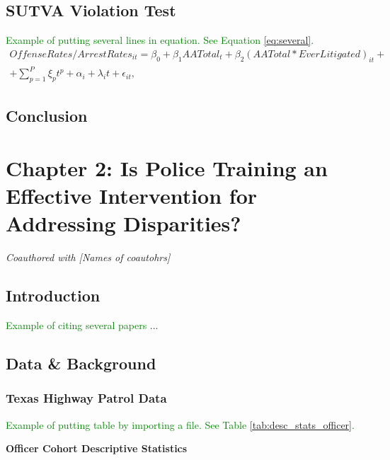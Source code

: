 \documentclass[12pt, letterpage]{article}
\begin{document}
\subsection{SUTVA Violation Test}

\textcolor{green}{Example of putting several lines in equation. See Equation \ref{eq:several}.}
\begin{equation} \label{eq:several}
\begin{split}
OffenseRates/ArrestRates_{it} = \beta_{0} + \beta_{1}AATotal_{t} + \beta_{2}(AATotal*EverLitigated)_{it} + \\ + \sum_{p=1}^{P}\xi_{p}t^{p} + \alpha_{i} + \lambda_{i}t + \epsilon_{it},
\end{split}
\end{equation}

\subsection{Conclusion}

\newpage


\setcounter{table}{0}
\setcounter{figure}{0}
\setcounter{footnote}{0}
\setcounter{equation}{0}

\section{Chapter 2: Is Police Training an Effective Intervention for Addressing Disparities?}

\textit{Coauthored with [Names of coautohrs]}

\subsection{Introduction}
\textcolor{green}{Example of citing several papers} \citep{wheller13, graziano14, skogan14, thompson16} ...

\subsection{Data \& Background}

\subsubsection{Texas Highway Patrol Data}
\textcolor{green}{Example of putting table by importing a file. See Table \ref{tab:desc_stats_officer}.}
\begin{table}
\centering 
\caption{\textbf{Officer Cohort Descriptive Statistics}}
\label{tab:desc_stats_officer} 

\end{table}
\end{document}
